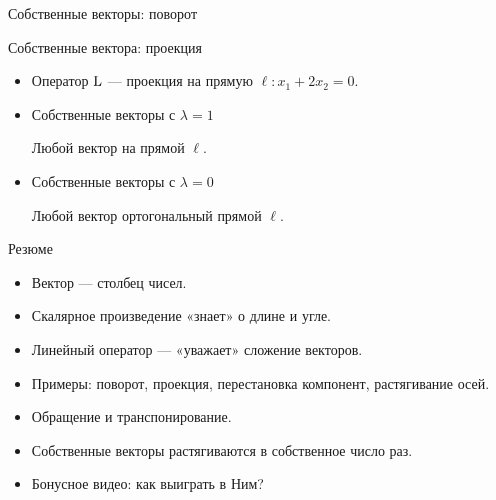 \begin{frame}{Собственные векторы: поворот}
    


\end{frame}




\begin{frame}{Собственные вектора: проекция}

\begin{itemize}[<+->]
\item Оператор $\operatorname{L}$ — проекция на прямую $\ell: x_1 + 2x_2 = 0$.

\item Собственные векторы с $\lambda = 1$

Любой вектор на прямой $\ell$.

\item Собственные векторы с $\lambda = 0$

Любой вектор ортогональный прямой $\ell$.
\end{itemize}

\end{frame}
    

\begin{frame}{Резюме}



\begin{itemize}[<+->]
\item Вектор — столбец чисел.
\item Скалярное произведение «знает» о длине и угле.
\item Линейный оператор — «уважает» сложение векторов.
\item Примеры: поворот, проекция, перестановка компонент, растягивание осей.
\item Обращение и транспонирование. 
\item Собственные векторы растягиваются в собственное число раз.  
\item \alert{Бонусное видео}: как выиграть в Ним?
\end{itemize}


\end{frame}








